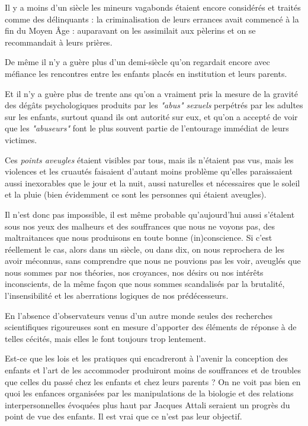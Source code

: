  Il y a moins d'un siècle les mineurs vagabonds étaient encore considérés et traités comme des délinquants : la criminalisation de leurs errances avait commencé à la fin du Moyen Âge : auparavant on les assimilait aux pèlerins et on se recommandait à leurs prières. 

 De même il n'y a guère plus d'un demi-siècle qu'on regardait encore avec méfiance les rencontres entre les enfants placés en institution et leurs parents. 

 Et il n'y a guère plus de trente ans qu'on a vraiment pris la mesure de la gravité des dégâts psychologiques produits par les \emph{"abus" sexuels} perpétrés par les adultes sur les enfants, surtout quand ils ont autorité sur eux, et qu'on a accepté de voir que les \emph{"abuseurs"} font le plus souvent partie de l'entourage immédiat de leurs victimes. 
 
 Ces \emph{points aveugles} étaient visibles par tous, mais ils n'étaient pas vus, mais les violences et les cruautés faisaient d'autant moins problème qu'elles paraissaient aussi inexorables que le jour et la nuit, aussi naturelles et nécessaires que le soleil et la pluie (bien évidemment ce sont les personnes qui étaient aveugles). 
 
 Il n'est donc pas impossible, il est même probable qu'aujourd'hui aussi s'étalent sous nos yeux des malheurs et des souffrances que nous ne voyons pas, des maltraitances que nous produisons en toute bonne (in)conscience. Si c'est réellement le cas, alors dans un siècle, ou dans dix, on nous reprochera de les avoir méconnus, sans comprendre que nous ne pouvions pas les voir, aveuglés que nous sommes par nos théories, nos croyances, nos désirs ou nos intérêts inconscients, de la même façon que nous sommes scandalisés par la brutalité, l'insensibilité et les aberrations logiques de nos prédécesseurs. 
 
 En l'absence d'observateurs venus d'un autre monde seules des recherches scientifiques rigoureuses sont en mesure d'apporter des éléments de réponse à de telles cécités, mais elles le font toujours trop lentement.


 
 
 Est-ce que les lois et les pratiques qui encadreront à l'avenir la conception des enfants et l'art de les accommoder produiront moins de souffrances et de troubles que celles du passé chez les enfants et chez leurs parents ? On ne voit pas bien en quoi les enfances organisées par les manipulations de la biologie et des relations interpersonnelles évoquées plus haut par Jacques Attali seraient un progrès du point de vue des enfants. Il est vrai que ce n'est pas leur objectif. 

